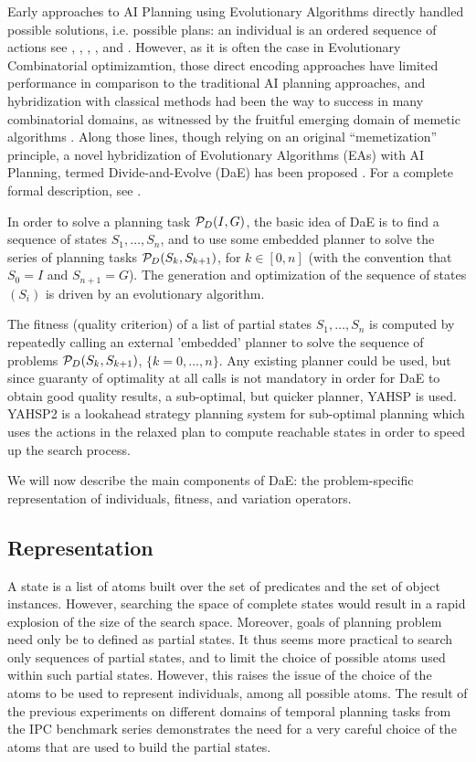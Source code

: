 \documentclass{acm_proc_article-sp}
\begin{document}
Early approaches to AI Planning using Evolutionary Algorithms directly handled possible solutions, i.e. possible plans: an individual is an ordered sequence of actions see \cite{Spector-AAAI-94}, \cite{muslea97}, \cite{westerberg:2000}, \cite{westerberg:2001}, and \cite{Morignot-2005}. However, as it is often the case in Evolutionary Combinatorial optimizamtion, those direct encoding approaches have limited performance in comparison to the traditional AI planning approaches, and hybridization with classical methods had been the way to success in many combinatorial domains, as witnessed by the fruitful emerging domain of memetic algorithms \cite{MemeticBook:2005}. Along those lines, though relying on an original ``memetization'' principle, a novel hybridization of Evolutionary Algorithms (EAs) with AI Planning, termed Divide-and-Evolve (DaE) has been proposed \cite{DAE:EvoCOP06} \cite{DAE:book-2007}. For a complete formal description, see \cite{Bibai:ICAPS2010}.

In order to solve a planning task ${\cal P}_D(I,G)$, the basic idea of DaE is to find a sequence of states $S_1, \ldots, S_n$, and to use some embedded planner to solve the series of planning tasks ${\cal P}_D(S_{k},S_{k+1})$, for $k \in [0,n]$ (with the convention that $S_0 = I$ and $S_{n+1} = G$). The generation and optimization of the sequence of states $(S_i)$ is driven by an evolutionary algorithm. 

The fitness (quality criterion) of a list of partial states $S_1, \ldots, S_n$ is computed by repeatedly calling an external 'embedded' planner to solve the sequence of problems ${\cal P}_D(S_{k},S_{k+1})$, $\{k=0,\ldots,n\}$. Any existing planner could be used, but since guaranty of optimality at all calls is not mandatory in order for DaE to obtain good quality results, a sub-optimal, but quicker planner, YAHSP is used. YAHSP2 \cite{V:icaps04} is a lookahead strategy planning system for sub-optimal planning which uses the  actions in the relaxed plan to compute reachable states in order to speed up the search process. 

We will now describe the main components of DaE: the problem-specific representation of individuals, fitness, and variation operators.

\subsection{Representation}
\label{section:representation}
A state is a list of atoms built over the set of predicates and the set of object instances. However, searching the space of complete states would result in a rapid explosion of the size of the search space. Moreover, goals of planning problem need only be to defined as partial states. It thus seems more practical to search only sequences of partial states, and to limit the choice of possible atoms used within such partial states. However, this raises the issue of the choice of the atoms to be used to represent individuals, among all possible atoms. The result of the previous experiments on different domains of temporal planning tasks from the IPC benchmark series \cite{BibEvoCop2009} demonstrates the need for a very careful choice of the atoms that are used to build the partial states. 
\end{document}
